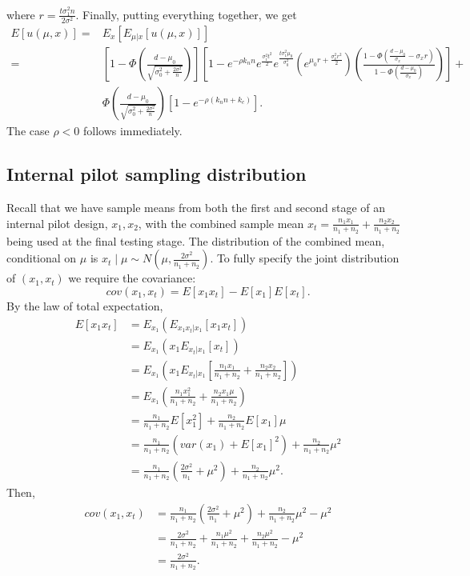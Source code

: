 \documentclass[sagev, Crown]{sagej}
\begin{document}
where $r = \frac{t \sigma_1^2 n}{2\sigma^2}$. Finally, putting everything together, we get
\begin{align*}
E[u(\mu, x)] =& E_x\left[ E_{\mu | x} [u(\mu, x)] \right] \\
 =& \left[ 1- \Phi\left(\frac{d-\mu_0}{\sqrt{\sigma_0^2 + \frac{2\sigma^2}{n}}} \right)  \right] \left[ 1 - e^{-\rho k_n n} e^{\frac{\sigma_1^2 t^2}{2}} e^{\frac{t\sigma_1^2 \mu_0}{\sigma_0^2}} \left( e^{\mu_0 r + \frac{\sigma_x^2 r^2}{2} } \right) \left(\frac{1 - \Phi(\frac{d-\mu_0}{\sigma_x} - \sigma_x r)}{1 - \Phi(\frac{d-\mu_0}{\sigma_x})} \right)  \right] + \\
 & \Phi\left(\frac{d-\mu_0}{\sqrt{\sigma_0^2 + \frac{2\sigma^2}{n}}} \right) \left[1 - e^{-\rho(k_n n + k_c)}\right].
\end{align*}
The case $\rho < 0$ follows immediately.

\subsection*{Internal pilot sampling distribution}

Recall that we have sample means from both the first and second stage of an internal pilot design, $x_1, x_2$, with the combined sample mean $x_t = \frac{n_1 x_1}{n_1 + n_2} + \frac{n_2 x_2}{n_1 + n_2}$ being used at the final testing stage. The distribution of the combined mean, conditional on $\mu$ is $x_t \mid \mu \sim N\left( \mu, \frac{2\sigma^2}{n_1 + n_2} \right)$. To fully specify the joint distribution of $(x_1, x_t)$ we require the covariance:
$$
cov(x_1, x_t) = E[x_1 x_t] - E[x_1] E[x_t].
$$
By the law of total expectation,
\begin{align*}
E[x_1 x_t] &= E_{x_1} ( E_{x_1 x_t | x_1}[x_1 x_t] ) \\
&= E_{x_1} ( x_1 E_{x_t | x_1}[x_t] ) \\
&= E_{x_1} \left( x_1 E_{x_t | x_1}\left[\frac{n_1 x_1}{n_1 + n_2} + \frac{n_2 x_2}{n_1 + n_2}\right] \right) \\
&= E_{x_1} \left( \frac{n_1 x_1^2}{n_1 + n_2} + \frac{n_2 x_1 \mu}{n_1 + n_2} \right) \\
&= \frac{n_1}{n_1 + n_2} E[x_1^2] + \frac{n_2}{n_1 + n_2} E[x_1] \mu \\
&= \frac{n_1}{n_1 + n_2} (var(x_1) + E[x_1]^2) + \frac{n_2}{n_1 + n_2} \mu^2 \\
&= \frac{n_1}{n_1 + n_2} \left(\frac{2\sigma^2}{n_1} + \mu^2\right) + \frac{n_2}{n_1 + n_2} \mu^2.
\end{align*}
Then,
\begin{align*}
cov(x_1, x_t) &= \frac{n_1}{n_1 + n_2} \left(\frac{2\sigma^2}{n_1} + \mu^2\right) + \frac{n_2}{n_1 + n_2} \mu^2 - \mu^2 \\
&= \frac{2\sigma^2}{n_1 + n_2} + \frac{n_1 \mu^2}{n_1 + n_2} + \frac{n_2 \mu^2}{n_1 + n_2} - \mu^2 \\
&= \frac{2\sigma^2}{n_1 + n_2} .
\end{align*}
\end{document}
